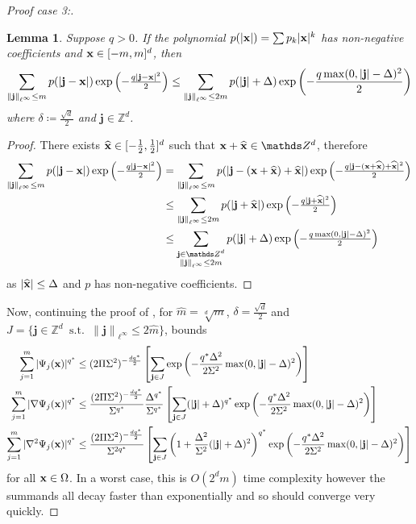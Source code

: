 \documentclass[10pt,a4paper,onecolumn]{article}
\numberwithin{equation}{section}
\newtheorem{lemma}{Lemma}[section]\newtheorem{example}{Example}[section]
\let\F\mathds\let\C\mathcal\newcommand{\R}{\F{R}}\newcommand{\A}{\C{A}}
\newcommand{\norm}[1]{{\left\lVert #1 \right\rVert}}
\DeclareMathOperator{\st}{\;s.t.\;}\DeclareMathOperator{\as}{\;a.s.\;}\renewcommand{\epsilon}{\varepsilon}
\renewcommand{\vec}{\mathbf}
\newcommand{\UCmath}[1]{%
	\begingroup
	\ucmathlist\uppercase\expandafter{#1}%
	\endgroup
}
\newcommand{\ucmathlist}{%
	\def\alpha{\mathrm{A}}%
	\def\beta{\mathrm{B}}%
	\let\gamma=\Gamma
	\let\delta=\Delta
	\def\epsilon{\mathrm{E}}%
	\def\varepsilon{\mathrm{E}}%
	\def\zeta{\mathrm{Z}}%
	\def\eta{\mathrm{H}}%
	\let\theta=\Theta
	\let\vartheta=\Theta
	\def\iota{\mathrm{I}}%
	\def\kappa{\mathrm{K}}%
	\let\lambda=\Lambda
	\def\mu{\mathrm{M}}%
	\def\nu{\mathrm{N}}%
	\let\xi=\Xi
	\let\pi=\Pi
	\let\varpi=\Pi
	\def\rho{\mathrm{P}}%
	\def\varrho{\mathrm{P}}%
	\let\sigma=\Sigma
	\def\tau{\mathrm{T}}%
	\let\upsilon=\Upsilon
	\let\phi=\Phi
	\let\varphi=\Phi
	\def\chi{\mathrm{X}}%
	\let\psi=\Psi
	\let\omega=\Omega
}
\newcommand{\caps}[1]{\UCmath{#1}}
\newcommand*{\vard}[1]{%
	\IfEqCase{#1}{%
		{0}{\varphi}%
		{1}{\psi}%
	}[\varphi #1]%
}
\newcommand*{\varx}[1]{%
	\IfEqCase{#1}{%
		{0}{x}%
		{1}{y}%
		{2}{z}%
		{3}{r}%
	}[x#1]%
}
\newcommand{\Domain}{\Omega}
\newcommand*{\Varx}[1]{\caps{\varx{#1}}}
\newcommand*{\vvarx}[1]{\vec{\varx{#1}}}\newcommand*{\vVarx}[1]{\vec{\Varx{#1}}}
\begin{document}
\begin{proof}[Proof case 3:]
	\begin{lemma}\label{app: exp sum bound}
		Suppose $q>0$. If the polynomial $p(|\vvarx0|) = \sum p_k|\vvarx0|^k$ has non-negative coefficients and $\vvarx0\in[-m,m]^d$, then
		$$\sum_{\norm{\vec{j}}_{\ell^\infty}\leq m} p(|\vec{j}-\vvarx0|)\exp\left(-\tfrac{q|\vec{j}-\vvarx0|^2}{2}\right)\leq \sum_{\norm{\vec{j}}_{\ell^\infty}\leq2m}p(|\vec{j}|+\delta)\exp\left(-\frac{q\max(0,|\vec{j}|-\delta)^2}{2}\right)$$
		where $\delta\coloneqq \frac{\sqrt{d}}{2}$ and $\vec{j}\in\F Z^d$.
	\end{lemma}
	\begin{proof}
		There exists $\hat{\vvarx0}\in[-\tfrac12,\tfrac12]^d$ such that $\vvarx0 + \hat{\vvarx0}\in\F Z^d$, therefore
		\begin{align*}
			\sum_{\norm{\vec{j}}_{\ell^\infty}\leq m} p(|\vec{j}-\vvarx0|)\exp\left(-\tfrac{q|\vec{j}-\vvarx0|^2}{2}\right) &= \sum_{\norm{\vec{j}}_{\ell^\infty}\leq m} p(|\vec{j}-(\vvarx0+\hat{\vvarx0})+\hat{\vvarx0}|)\exp\left(-\tfrac{q|\vec{j}-(\vvarx0+\hat{\vvarx0})+\hat{\vvarx0}|^2}{2}\right)
			\\&\leq \sum_{\norm{\vec{j}}_{\ell^\infty}\leq2m} p(|\vec{j}+\hat{\vvarx0}|)\exp\left(-\tfrac{q|\vec{j}+\hat{\vvarx0}|^2}{2}\right)
			\\&\leq \sum_{\substack{\vec{j}\in\F Z^d\\\norm{\vec{j}}_{\ell^\infty}\leq2m}} p(|\vec{j}|+\delta)\exp\left(-\tfrac{q\max(0,|\vec{j}|-\delta)^2}{2}\right)
		\end{align*}
		as $|\hat{\vvarx0}|\leq \delta$ and $p$ has non-negative coefficients. 
	\end{proof}
	
	Now, continuing the proof of , for $\hat m=\sqrt[d]{m}$, $\delta=\frac{\sqrt{d}}{2}$ and $J=\{\vec{j}\in\F Z^d \st \norm{\vec{j}}_{\ell^\infty}\leq 2\hat m\}$,  bounds 
	\begin{align*}
		\sum_{j=1}^m |\vard1_j(\vvarx0)|^{q^*} &\leq (2\pi\sigma^2)^{-\frac{dq^*}{2}} \left[\sum_{\vec{j}\in J} \exp\left(-\frac{q^*\Delta^2}{2\sigma^2}\max(0,|\vec{j}|-\delta)^2\right)\right]
		\\\sum_{j=1}^m |\nabla\vard1_j(\vvarx0)|^{q^*} &\leq \frac{(2\pi\sigma^2)^{-\frac{dq^*}{2}}}{\sigma^{q^*}}\frac{\Delta^{q^*}}{\sigma^{q^*}} \left[\sum_{\vec{j}\in J} (|\vec{j}|+\delta)^{q^*}\exp\left(-\frac{q^*\Delta^2}{2\sigma^2}\max(0,|\vec{j}|-\delta)^2\right)\right]
		\\\sum_{j=1}^m |\nabla^2\vard1_j(\vvarx0)|^{q^*} &\leq \frac{(2\pi\sigma^2)^{-\frac{dq^*}{2}}}{\sigma^{2q^*}} \left[\sum_{\vec{j}\in J} \left(1+\frac{\Delta^2}{\sigma^2}(|\vec{j}|+\delta)^2\right)^{q^*}\exp\left(-\frac{q^*\Delta^2}{2\sigma^2}\max(0,|\vec{j}|-\delta)^2\right)\right]
	\end{align*}
	for all $\vvarx0\in\Domain$. In a worst case, this is $O(2^dm)$ time complexity however the summands all decay faster than exponentially and so should converge very quickly.	
\end{proof}
\end{document}
